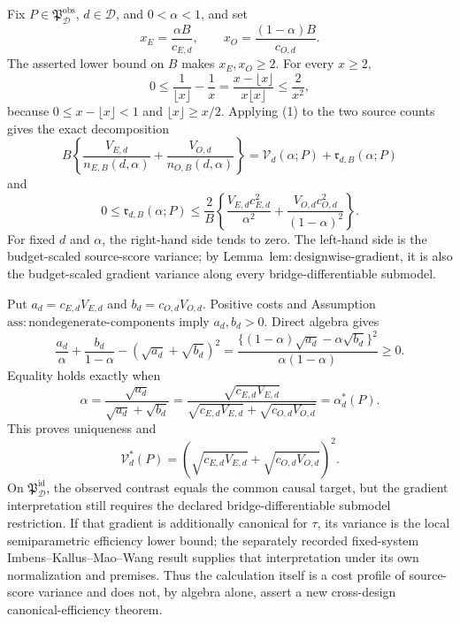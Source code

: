 Fix \(P\in\mathfrak P_{\mathcal D}^{\mathrm{obs}}\), \(d\in\mathcal D\), and \(0<\alpha<1\), and set
\[
 x_E=\frac{\alpha B}{c_{E,d}},\qquad
 x_O=\frac{(1-\alpha)B}{c_{O,d}}.
\]
The asserted lower bound on \(B\) makes \(x_E,x_O\ge2\). For every \(x\ge2\),
\[
 0\le \frac1{\lfloor x\rfloor}-\frac1x
 =\frac{x-\lfloor x\rfloor}{x\lfloor x\rfloor}
 \le\frac2{x^2}, \tag{1}
\]
because \(0\le x-\lfloor x\rfloor<1\) and \(\lfloor x\rfloor\ge x/2\). Applying (1) to the two source counts gives the exact decomposition
\[
 B\left\{\frac{V_{E,d}}{n_{E,B}(d,\alpha)}
 +\frac{V_{O,d}}{n_{O,B}(d,\alpha)}\right\}
 =\mathcal V_d(\alpha;P)+\mathfrak r_{d,B}(\alpha;P)
\]
and
\[
 0\le\mathfrak r_{d,B}(\alpha;P)
 \le\frac2B\left\{
 \frac{V_{E,d}c_{E,d}^2}{\alpha^2}
 +\frac{V_{O,d}c_{O,d}^2}{(1-\alpha)^2}\right\}. \tag{2}
\]
For fixed \(d\) and \(\alpha\), the right-hand side tends to zero. The left-hand side is the budget-scaled source-score variance; by Lemma~\(\mathrm{lem{:}designwise\text{-}gradient}\), it is also the budget-scaled gradient variance along every bridge-differentiable submodel.

Put \(a_d=c_{E,d}V_{E,d}\) and \(b_d=c_{O,d}V_{O,d}\). Positive costs and Assumption~\(\mathrm{ass{:}nondegenerate\text{-}components}\) imply \(a_d,b_d>0\). Direct algebra gives
\[
 \frac{a_d}{\alpha}+\frac{b_d}{1-\alpha}
 -(\sqrt{a_d}+\sqrt{b_d})^2
 =\frac{\{(1-\alpha)\sqrt{a_d}-\alpha\sqrt{b_d}\}^2}
 {\alpha(1-\alpha)}\ge0. \tag{3}
\]
Equality holds exactly when
\[
 \alpha=\frac{\sqrt{a_d}}{\sqrt{a_d}+\sqrt{b_d}}
 =\frac{\sqrt{c_{E,d}V_{E,d}}}
 {\sqrt{c_{E,d}V_{E,d}}+\sqrt{c_{O,d}V_{O,d}}}
 =\alpha_d^*(P).
\]
This proves uniqueness and
\[
 \mathcal V_d^*(P)
 =(\sqrt{c_{E,d}V_{E,d}}+\sqrt{c_{O,d}V_{O,d}})^2.
\]
On \(\mathfrak P_{\mathcal D}^{\mathrm{id}}\), the observed contrast equals the common causal target, but the gradient interpretation still requires the declared bridge-differentiable submodel restriction. If that gradient is additionally canonical for \(\tau\), its variance is the local semiparametric efficiency lower bound; the separately recorded fixed-system Imbens--Kallus--Mao--Wang result supplies that interpretation under its own normalization and premises. Thus the calculation itself is a cost profile of source-score variance and does not, by algebra alone, assert a new cross-design canonical-efficiency theorem.